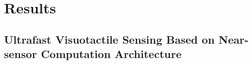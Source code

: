 \documentclass[10pt,a4paper]{article}
\begin{document}

\section*{Results}
\subsection*{Ultrafast Visuotactile Sensing Based on Near-sensor Computation Architecture} 
\end{document}
